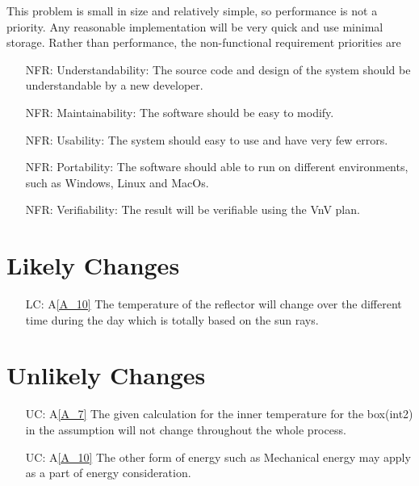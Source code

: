 \documentclass[12pt]{article}
\newcommand{\aref}[1]{A\ref{#1}}
\newcounter{nfrnum} %
\newcounter{lcnum} %
\newcounter{ucnum} %
\begin{document}
This problem is small in size and relatively simple, so performance is not a priority. Any reasonable implementation will be very quick and use minimal storage. Rather than performance, the non-functional requirement priorities are 
\begin{itemize}

\item[NFR\refstepcounter{nfrnum}\thenfrnum \label{NFR_accuracy}:] Understandability: The source code and design of the system should be understandable by a new developer. 

\item[NFR\refstepcounter{nfrnum}\thenfrnum \label{NFR_accuracy}:] Maintainability: The software should be easy to modify.   

\item[NFR\refstepcounter{nfrnum}\thenfrnum \label{NFR_accuracy}:] Usability: The system should easy to use and have very few errors. 

\item[NFR\refstepcounter{nfrnum}\thenfrnum \label{NFR_accuracy}:] Portability: The software should able to run on different environments, such as Windows, Linux and MacOs.  

\item[NFR\refstepcounter{nfrnum}\thenfrnum \label{NFR_accuracy}:] Verifiability: The result will be verifiable using the VnV plan.  

 
\end{itemize}

\section{Likely Changes}    

\noindent \begin{itemize}

\item[LC\refstepcounter{lcnum}\thelcnum\label{LC_1}:] \aref{A_10} 
The temperature of the reflector will change over the different time during the day which is totally based on the sun rays. 

\end{itemize}

\section{Unlikely Changes}    

\noindent \begin{itemize}

\item[UC\refstepcounter{ucnum}\theucnum\label{LC_2}:] 
\aref{A_7} 
The given calculation for the inner temperature for the box(int2) in the assumption will not change throughout the whole process.

\item[UC\refstepcounter{ucnum}\theucnum\label{LC_3}:] \aref{A_10} 
The other form of energy such as Mechanical energy may apply as a part of energy consideration.

\end{itemize}
\end{document}
